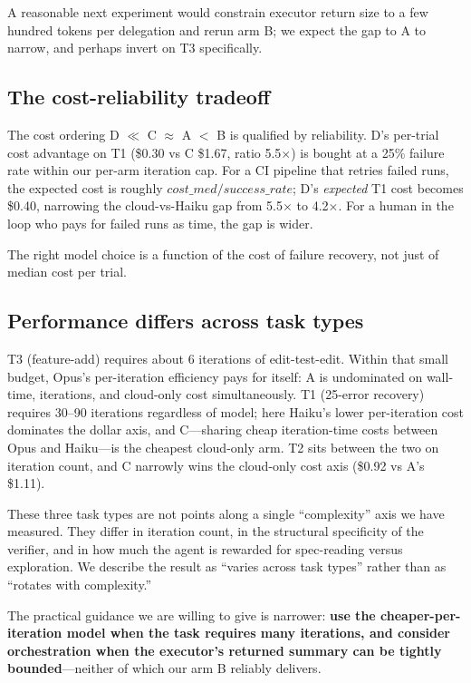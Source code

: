 \documentclass[11pt,a4paper]{article}
\begin{document}
A reasonable next experiment would constrain executor return size to a few hundred tokens per delegation and rerun arm B; we expect the gap to A to narrow, and perhaps invert on T3 specifically.

\subsection{The cost-reliability tradeoff}

The cost ordering D $\ll$ C $\approx$ A $<$ B is qualified by reliability. D's per-trial cost advantage on T1 (\$0.30 vs C \$1.67, ratio 5.5$\times$) is bought at a 25\% failure rate within our per-arm iteration cap. For a CI pipeline that retries failed runs, the expected cost is roughly $\mathit{cost\_med} / \mathit{success\_rate}$; D's \emph{expected} T1 cost becomes \$0.40, narrowing the cloud-vs-Haiku gap from 5.5$\times$ to 4.2$\times$. For a human in the loop who pays for failed runs as time, the gap is wider.

The right model choice is a function of the cost of failure recovery, not just of median cost per trial.

\subsection{Performance differs across task types}

T3 (feature-add) requires about 6 iterations of edit-test-edit. Within that small budget, Opus's per-iteration efficiency pays for itself: A is undominated on wall-time, iterations, and cloud-only cost simultaneously. T1 (25-error recovery) requires 30--90 iterations regardless of model; here Haiku's lower per-iteration cost dominates the dollar axis, and C---sharing cheap iteration-time costs between Opus and Haiku---is the cheapest cloud-only arm. T2 sits between the two on iteration count, and C narrowly wins the cloud-only cost axis (\$0.92 vs A's \$1.11).

These three task types are not points along a single ``complexity'' axis we have measured. They differ in iteration count, in the structural specificity of the verifier, and in how much the agent is rewarded for spec-reading versus exploration. We describe the result as ``varies across task types'' rather than as ``rotates with complexity.''

The practical guidance we are willing to give is narrower: \textbf{use the cheaper-per-iteration model when the task requires many iterations, and consider orchestration when the executor's returned summary can be tightly bounded}---neither of which our arm B reliably delivers.
\end{document}
